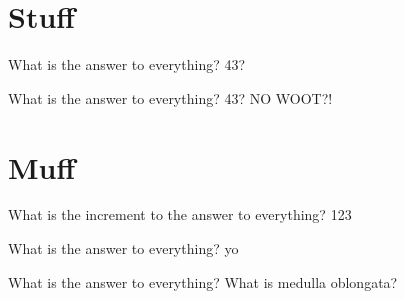\documentclass[12pt]{article}
\begin{document}
\section{Stuff}
\begin{myexercise}
	What is the answer to everything?
	\tcblower{}
	43?
\end{myexercise}

\begin{myexercise}
	What is the answer to everything?
	\tcblower{}
	43?
	NO
	WOOT?!
\end{myexercise}

\section{Muff}
\begin{myexercise}
	What is the increment to the answer to everything?
	\tcblower{}
	123
\end{myexercise}

\begin{myexercise}
	What is the answer to everything?
	\tcblower{}
	yo
\end{myexercise}

\begin{myexercise}
	What is the answer to everything?
	\tcblower{}
	What is medulla oblongata?
\end{myexercise}

\printindex
\end{document}
